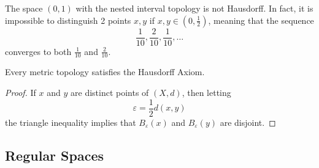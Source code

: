   \begin{example}
    The space $(0,1)$ with the nested interval topology is not Hausdorff. In fact, it is impossible to distinguish 2 points $x, y$ if $x, y \in (0, \frac{1}{2})$, meaning that the sequence
    \begin{equation}
        \frac{1}{10}, \frac{2}{10}, \frac{1}{10}, \ldots
    \end{equation}
    converges to both $\frac{1}{10}$ and $\frac{2}{10}$.
  \end{example} 

  \begin{theorem}
    Every metric topology satisfies the Hausdorff Axiom.
  \end{theorem}
  \begin{proof}
    If $x$ and $y$ are distinct points of $(X, d)$, then letting
    \begin{equation}
      \varepsilon = \frac{1}{2} d(x, y)
    \end{equation}
    the triangle inequality implies that $B_\varepsilon (x)$ and $B_\varepsilon (y)$ are disjoint. 
  \end{proof}


\subsection{Regular Spaces}

